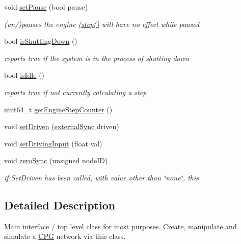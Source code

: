 \begin{DoxyCompactItemize}
void \mbox{\hyperlink{classMatsuokaEngine_a929ade3a9ce6497e47183190255cbfae}{set\+Pause}} (bool pause)
\begin{DoxyCompactList}\small\item\em (un/)pauses the engine (\mbox{\hyperlink{classMatsuokaEngine_a4fa468dc0814f1ad92594f7a4d5abd00}{step()}} will have no effect while paused \end{DoxyCompactList}\item 
bool \mbox{\hyperlink{classMatsuokaEngine_a5d7bb7f68eb7338a6c34eef10d421f68}{is\+Shutting\+Down}} ()
\begin{DoxyCompactList}\small\item\em reports true if the system is in the process of shutting down \end{DoxyCompactList}\item 
bool \mbox{\hyperlink{classMatsuokaEngine_a1b6e6f86762e4541854b4262eb217f7e}{is\+Idle}} ()
\begin{DoxyCompactList}\small\item\em reports true if not currently calculating a step \end{DoxyCompactList}\item 
uint64\+\_\+t \mbox{\hyperlink{classMatsuokaEngine_a40114e7866da03ae1b7f37bcbde09876}{get\+Engine\+Step\+Counter}} ()
\item 
void \mbox{\hyperlink{classMatsuokaEngine_a738106afa4c313de36150a9687700193}{set\+Driven}} (\mbox{\hyperlink{classMatsuokaEngine_ad8f471b2f1ca479174d5514b9a3597ec}{external\+Sync}} driven)
\item 
void \mbox{\hyperlink{classMatsuokaEngine_a08b0d367297310a788461e3610e80623}{set\+Driving\+Input}} (float val)
\item 
void \mbox{\hyperlink{classMatsuokaEngine_a9ecbc93a17a602d8358c189363397575}{zero\+Sync}} (unsigned node\+ID)
\begin{DoxyCompactList}\small\item\em if Set\+Driven has been called, with value other than \char`\"{}none\char`\"{}, this \end{DoxyCompactList}\end{DoxyCompactItemize}


\subsection{Detailed Description}
Main interface / top level class for most purposes. Create, manipulate and simulate a \mbox{\hyperlink{classCPG}{C\+PG}} network via this class. 


